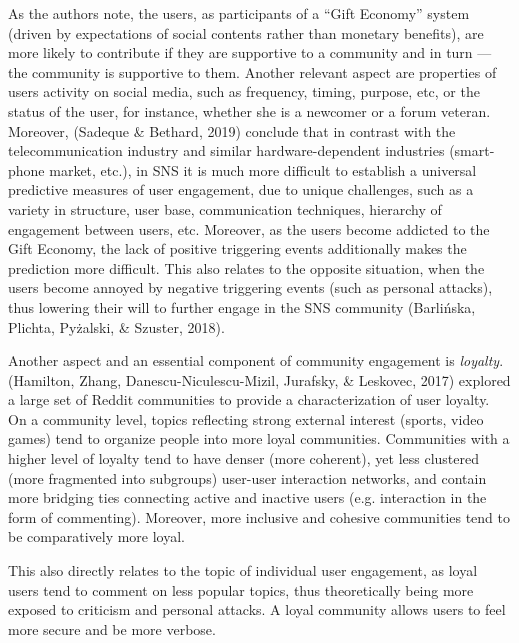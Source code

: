 \documentclass[10pt,dvipsnames]{scrartcl}
\begin{document}
As the authors note, the users, as participants of a ``Gift Economy''
system (driven by expectations of social contents rather than monetary
benefits), are more likely to contribute if they are supportive to a
community and in turn --- the community is supportive to them. Another
relevant aspect are properties of users activity on social media, such
as frequency, timing, purpose, etc, or the status of the user, for
instance, whether she is a newcomer or a forum veteran. Moreover,
(Sadeque \& Bethard, 2019) conclude that in contrast with the
telecommunication industry and similar hardware-dependent industries
(smart-phone market, etc.), in SNS it is much more difficult to
establish a universal predictive measures of user engagement, due to
unique challenges, such as a variety in structure, user base,
communication techniques, hierarchy of engagement between users, etc.
Moreover, as the users become addicted to the Gift Economy, the lack of
positive triggering events additionally makes the prediction more
difficult. This also relates to the opposite situation, when the users
become annoyed by negative triggering events (such as personal attacks),
thus lowering their will to further engage in the SNS community
(Barlińska, Plichta, Pyżalski, \& Szuster, 2018).

Another aspect and an essential component of community engagement is
\textit{loyalty}. (Hamilton, Zhang, Danescu-Niculescu-Mizil, Jurafsky,
\& Leskovec, 2017) explored a large set of Reddit communities to provide
a characterization of user loyalty. On a community level, topics
reflecting strong external interest (sports, video games) tend to
organize people into more loyal communities. Communities with a higher
level of loyalty tend to have denser (more coherent), yet less clustered
(more fragmented into subgroups) user-user interaction networks, and
contain more bridging ties connecting active and inactive users (e.g.
interaction in the form of commenting). Moreover, more inclusive and
cohesive communities tend to be comparatively more loyal.

This also directly relates to the topic of individual user engagement,
as loyal users tend to comment on less popular topics, thus
theoretically being more exposed to criticism and personal attacks. A
loyal community allows users to feel more secure and be more verbose.
\end{document}
